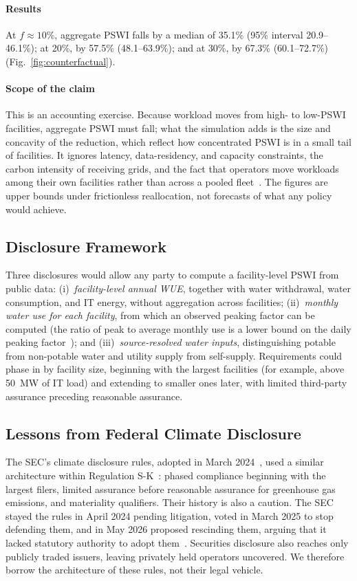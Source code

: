 \documentclass[conference,10pt]{IEEEtran}
\begin{document}
\paragraph{Results}
At $f \approx 10\%$, aggregate PSWI falls by a median of 35.1\% (95\%
interval 20.9--46.1\%); at 20\%, by 57.5\% (48.1--63.9\%); and at 30\%, by
67.3\% (60.1--72.7\%) (Fig.~\ref{fig:counterfactual}).

\paragraph{Scope of the claim}
This is an accounting exercise. Because workload moves from high- to
low-PSWI facilities, aggregate PSWI must fall; what the simulation adds is
the size and concavity of the reduction, which reflect how concentrated
PSWI is in a small tail of facilities. It ignores latency, data-residency,
and capacity constraints, the carbon intensity of receiving grids, and the
fact that operators move workloads among their own facilities rather than
across a pooled fleet~\cite{liu2024gsr, li2024equitable}. The figures are
upper bounds under frictionless reallocation, not forecasts of what any
policy would achieve.

\subsection{Disclosure Framework}

Three disclosures would allow any party to compute a facility-level PSWI
from public data:
(i)~\emph{facility-level annual WUE}, together with water withdrawal,
water consumption, and IT energy, without aggregation across facilities;
(ii)~\emph{monthly water use for each facility}, from which an observed
peaking factor can be computed (the ratio of peak to average monthly use is
a lower bound on the daily peaking factor~\cite{han2026}); and
(iii)~\emph{source-resolved water inputs}, distinguishing potable from
non-potable water and utility supply from self-supply. Requirements could
phase in by facility size, beginning with the largest facilities (for
example, above 50~MW of IT load) and extending to smaller ones later, with
limited third-party assurance preceding reasonable assurance.

\subsection{Lessons from Federal Climate Disclosure}

The SEC's climate disclosure rules, adopted in March 2024~\cite{sec2024climate},
used a similar architecture within Regulation S-K~\cite{secregsk}: phased
compliance beginning with the largest filers, limited assurance before
reasonable assurance for greenhouse gas emissions, and materiality
qualifiers. Their history is also a caution. The SEC stayed the rules in
April 2024 pending litigation, voted in March 2025 to stop defending them,
and in May 2026 proposed rescinding them, arguing that it lacked statutory
authority to adopt them~\cite{arnoldporter2026sec}. Securities disclosure
also reaches only publicly traded issuers, leaving privately held operators
uncovered. We therefore borrow the architecture of these rules, not their
legal vehicle.
\end{document}
